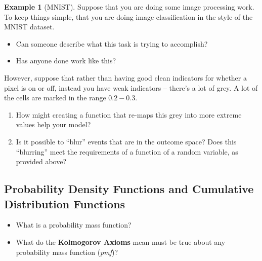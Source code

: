 \documentclass[
]{book}
\providecommand{\tightlist}{%
  \setlength{\itemsep}{0pt}\setlength{\parskip}{0pt}}
\theoremstyle{definition}
\theoremstyle{definition}
\newtheorem{example}{Example}[chapter]
\theoremstyle{definition}
\theoremstyle{definition}
\theoremstyle{remark}
\begin{document}
\begin{example}[MNIST]

Suppose that you are doing some image processing work. To keep things simple, that you are doing image classification in the style of the MNIST dataset.

\begin{itemize}
\tightlist
\item
  Can someone describe what this task is trying to accomplish?
\item
  Has anyone done work like this?
\end{itemize}

However, suppose that rather than having good clean indicators for whether a pixel is on or off, instead you have weak indicators -- there's a lot of grey. A lot of the cells are marked in the range \(0.2 - 0.3\).

\begin{enumerate}
\def\labelenumi{\arabic{enumi}.}
\tightlist
\item
  How might creating a function that re-maps this grey into more extreme values help your model?
\item
  Is it possible to ``blur'' events that are in the outcome space? Does this ``blurring'' meet the requirements of a function of a random variable, as provided above?
\end{enumerate}

\end{example}

\hypertarget{probability-density-functions-and-cumulative-distribution-functions}{%
\subsection{Probability Density Functions and Cumulative Distribution Functions}\label{probability-density-functions-and-cumulative-distribution-functions}}

\begin{itemize}
\tightlist
\item
  What is a probability mass function?
\item
  What do the \textbf{Kolmogorov Axioms} mean must be true about any probability mass function (\emph{pmf})?
\end{itemize}
\end{document}
